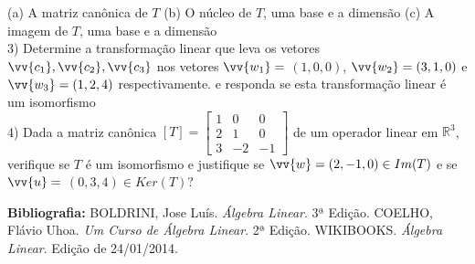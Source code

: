\documentclass[11pt,a4paper]{article}
\newcommand\tab[1][1.835cm]{\hspace*{#1}}
\newcommand\taba[1][2.55cm]{\hspace*{#1}}
\begin{document}
\begin{flushleft}
\taba(a) A matriz canônica de $T$ \linebreak
\taba(b) O núcleo de $T$, uma base e a dimensão \linebreak
\taba(c) A imagem de $T$, uma base e a dimensão \linebreak
\\
\tab 3) Determine a transformação linear que leva os vetores $\vv{c_1}, \vv{c_2}, \vv{c_3}$ nos vetores $\vv{w_1}=$ $(1,0,0)$, $\vv{w_2}=(3,1,0)$ e $\vv{w_3}=(1,2,4)$ respectivamente. e responda se esta transformação linear é um isomorfismo\linebreak
\\
\tab 4) Dada a matriz canônica $[T]= \begin{bmatrix}
1 & 0 & 0\\ 2 & 1 & 0\\ 3 & -2 & -1 \end{bmatrix}$ de um operador linear em $\mathbb{R}^3$, verifique se $T$ é um isomorfismo e justifique se $\vv{w}=(2,-1,0) \in Im(T)$ e se $\vv{u}= $ $(0,3,4) \in Ker(T)$?\linebreak



%
%
\textbf{Bibliografia: }BOLDRINI, Jose Luís. \textit{Álgebra Linear}. 3ª Edição. \linebreak
\taba COELHO, Flávio Uhoa. \textit{Um Curso de Álgebra Linear}. 2ª Edição.
\taba WIKIBOOKS. \textit{Álgebra Linear}. Edição de 24/01/2014. \linebreak
\end{flushleft}
\end{document}
